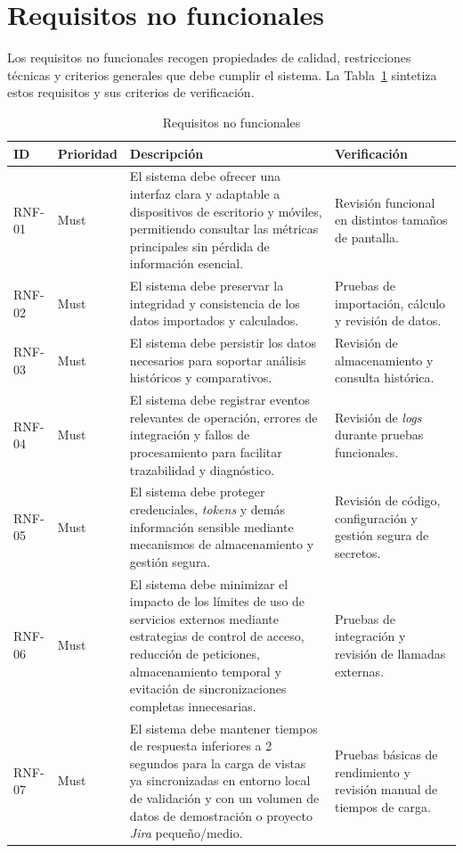 \FloatBarrier
\section{Requisitos no funcionales}

Los requisitos no funcionales recogen propiedades de calidad, restricciones técnicas y criterios generales que debe cumplir el sistema. La Tabla~\ref{tab:requisitos-no-funcionales} sintetiza estos requisitos y sus criterios de verificación.

{\renewcommand{\arraystretch}{1.28}\footnotesize
\begin{longtable}{p{1.35cm}p{1.65cm}p{6.9cm}p{2.9cm}}
\caption{Requisitos no funcionales}\label{tab:requisitos-no-funcionales}\\
\toprule
\textbf{ID} & \textbf{Prioridad} & \textbf{Descripción} & \textbf{Verificación} \\
\midrule
RNF-01 & Must & El sistema debe ofrecer una interfaz clara y adaptable a dispositivos de escritorio y móviles, permitiendo consultar las métricas principales sin pérdida de información esencial. & Revisión funcional en distintos tamaños de pantalla. \\
RNF-02 & Must & El sistema debe preservar la integridad y consistencia de los datos importados y calculados. & Pruebas de importación, cálculo y revisión de datos. \\
RNF-03 & Must & El sistema debe persistir los datos necesarios para soportar análisis históricos y comparativos. & Revisión de almacenamiento y consulta histórica. \\
RNF-04 & Must & El sistema debe registrar eventos relevantes de operación, errores de integración y fallos de procesamiento para facilitar trazabilidad y diagnóstico. & Revisión de \textit{logs} durante pruebas funcionales. \\
RNF-05 & Must & El sistema debe proteger credenciales, \textit{tokens} y demás información sensible mediante mecanismos de almacenamiento y gestión segura. & Revisión de código, configuración y gestión segura de secretos. \\
RNF-06 & Must & El sistema debe minimizar el impacto de los límites de uso de servicios externos mediante estrategias de control de acceso, reducción de peticiones, almacenamiento temporal y evitación de sincronizaciones completas innecesarias. & Pruebas de integración y revisión de llamadas externas. \\
RNF-07 & Must & El sistema debe mantener tiempos de respuesta inferiores a 2 segundos para la carga de vistas ya sincronizadas en entorno local de validación y con un volumen de datos de demostración o proyecto \textit{Jira} pequeño/medio. & Pruebas básicas de rendimiento y revisión manual de tiempos de carga. \\

\end{longtable}}
